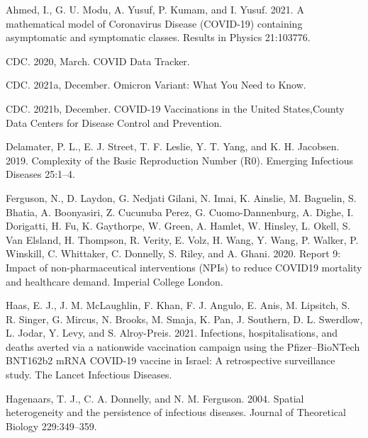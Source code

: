 \documentclass[
  12pt,
]{article}
\newlength{\cslhangindent}
\newlength{\cslentryspacingunit} %
\newenvironment{CSLReferences}[2] %
 {%
  \setlength{\parindent}{0pt}
  \ifodd #1
  \let\oldpar\par
  \def\par{\hangindent=\cslhangindent\oldpar}
  \fi
  \setlength{\parskip}{#2\cslentryspacingunit}
 }%
 {}
\begin{document}
\hypertarget{refs}{}
\begin{CSLReferences}{1}{0}
\leavevmode{}%
Ahmed, I., G. U. Modu, A. Yusuf, P. Kumam, and I. Yusuf. 2021. A mathematical model of {Coronavirus} {Disease} ({COVID}-19) containing asymptomatic and symptomatic classes. Results in Physics 21:103776.

\leavevmode{}%
CDC. 2020, March. {COVID} {Data} {Tracker}.

\leavevmode{}%
CDC. 2021a, December. Omicron {Variant}: {What} {You} {Need} to {Know}.

\leavevmode{}%
CDC. 2021b, December. {COVID}-19 {Vaccinations} in the {United} {States},{County} {\textbar} {Data} {\textbar} {Centers} for {Disease} {Control} and {Prevention}.

\leavevmode{}%
Delamater, P. L., E. J. Street, T. F. Leslie, Y. T. Yang, and K. H. Jacobsen. 2019. Complexity of the {Basic} {Reproduction} {Number} ({R0}). Emerging Infectious Diseases 25:1--4.

\leavevmode{}%
Ferguson, N., D. Laydon, G. Nedjati Gilani, N. Imai, K. Ainslie, M. Baguelin, S. Bhatia, A. Boonyasiri, Z. Cucunuba Perez, G. Cuomo-Dannenburg, A. Dighe, I. Dorigatti, H. Fu, K. Gaythorpe, W. Green, A. Hamlet, W. Hinsley, L. Okell, S. Van Elsland, H. Thompson, R. Verity, E. Volz, H. Wang, Y. Wang, P. Walker, P. Winskill, C. Whittaker, C. Donnelly, S. Riley, and A. Ghani. 2020. Report 9: {Impact} of non-pharmaceutical interventions ({NPIs}) to reduce {COVID19} mortality and healthcare demand. Imperial College London.

\leavevmode{}%
Haas, E. J., J. M. McLaughlin, F. Khan, F. J. Angulo, E. Anis, M. Lipsitch, S. R. Singer, G. Mircus, N. Brooks, M. Smaja, K. Pan, J. Southern, D. L. Swerdlow, L. Jodar, Y. Levy, and S. Alroy-Preis. 2021. Infections, hospitalisations, and deaths averted via a nationwide vaccination campaign using the {Pfizer}--{BioNTech} {BNT162b2} {mRNA} {COVID}-19 vaccine in {Israel}: A retrospective surveillance study. The Lancet Infectious Diseases.

\leavevmode{}%
Hagenaars, T. J., C. A. Donnelly, and N. M. Ferguson. 2004. Spatial heterogeneity and the persistence of infectious diseases. Journal of Theoretical Biology 229:349--359.


\end{CSLReferences}
\end{document}
